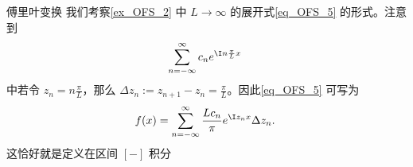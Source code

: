 \begin{example}{傅里叶变换}
我们考察\autoref{ex_OFS_2} 中 $L\rightarrow\infty$ 的展开式\autoref{eq_OFS_5} 的形式。注意到
\[
  \sum_{n=-\infty}^\infty c_ne^{\I n\frac{\pi}{L} x}~  
\]
中若令 $z_n=n\frac{\pi}{L}$，那么 $\Delta z_n:=z_{n+1}-z_n=\frac{\pi}{L}$。因此\autoref{eq_OFS_5} 可写为
\begin{equation}
f(x)=\sum_{n=-\infty}^\infty \frac{Lc_n}{\pi}e^{\I z_n x}\Delta z_n.~ 
\end{equation}
这恰好就是定义在区间 $[-]$ 积分
\begin{equation}

\end{equation}

\end{example}